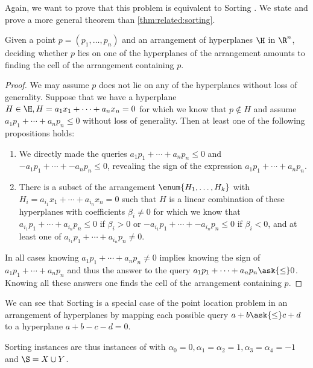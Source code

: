 Again, we want to prove that this problem is equivalent to Sorting \XY. We
state and prove a more general theorem than \ref{thm:related:sorting}.
\begin{theorem}\label{thm:related:sortingxy}
Given a point \(p = (p_1, \ldots, p_n)\) and an arrangement of hyperplanes
\(\H\) in \(\R^n\), deciding whether \(p\) lies on one of the hyperplanes of the
arrangement amounts to finding the cell of the arrangement containing \(p\).
\end{theorem}
\begin{proof}
We may assume \(p\) does not lie on any of the hyperplanes without loss of generality.
Suppose that we have a hyperplane \(H \in \H, H = a_1 x_1 + \cdots + a_n x_n = 0\) for which we
know that \(p \notin H\) and assume \(a_1 p_1 + \cdots + a_n p_n \le 0\)
without loss of generality.
Then at least one of the following propositions holds:
\begin{enumerate}
\item We directly made the queries \(a_1 p_1 + \cdots + a_n p_n \le 0\) and
\(-a_1 p_1 + \cdots + -a_n p_n \le 0\), revealing the sign of the expression
\(a_1 p_1 + \cdots + a_n p_n\).
\item There is a subset of the arrangement \(\enum{H_1,\ldots,H_k}\) with
\(H_i = a_{i_1} x_1 + \cdots + a_{i_n} x_n = 0\) such that \(H\) is a linear
combination of these hyperplanes with coefficients \(\beta_i \neq 0\) for which we
know that \(a_{i_1} p_1 + \cdots + a_{i_n} p_n \le 0\) if \(\beta_i > 0\) or
\(-a_{i_1} p_1 + \cdots + -a_{i_n} p_n \le 0\) if \(\beta_i < 0\), and at
least one of \(a_{i_1} p_1 + \cdots + a_{i_n} p_n \neq 0\).
\end{enumerate}
In all cases knowing \(a_1 p_1 + \cdots + a_n p_n \neq 0\) implies knowing the
sign of \(a_1 p_1 + \cdots + a_n p_n\) and thus the answer to the query \(a_1
p_1 + \cdots + a_n p_n \ask{\le} 0\). Knowing all these answers one finds the
cell of the arrangement containing \(p\).
\end{proof}

We can see that Sorting \XY is a special case of the point location problem in
an arrangement of hyperplanes by mapping each possible query $a + b \ask{\le} c
+ d$ to a hyperplane $a + b - c - d = 0$.

Sorting \XY instances are thus instances of \fourLDT
with $\alpha_0 = 0, \alpha_1 = \alpha_2 = 1, \alpha_3 = \alpha_4 = -1$ and
$\S = X \cup Y$.
